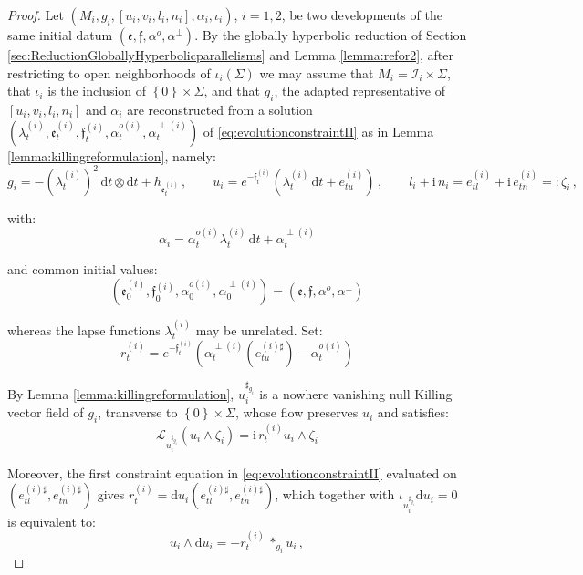 \documentclass[10pt,reqno,a4paper]{amsart}
\theoremstyle{plain}
\theoremstyle{definition}
\theoremstyle{remark}
\theoremstyle{remark}
\def\dd{\mathrm{d}}
\def\cI{\mathcal{I}}
\def\cL{\mathcal{L}}
\def\cL{\mathcal{L}}
\def\fre{\mathfrak{e}}
\renewcommand{\(}{ (}
\renewcommand{\)}{ )}
\newcommand{\frf}{\mathfrak{f}}
\begin{document}
\begin{proof}
Let $(M_i,g_i,[u_i,v_i,l_i,n_i],\alpha_i,\iota_i)$, $i = 1,2$, be two developments of the same initial datum $(\fre,\frf,\alpha^o,\alpha^{\perp})$. By the globally hyperbolic reduction of Section \ref{sec:ReductionGloballyHyperbolicparallelisms} and Lemma \ref{lemma:refor2}, after restricting to open neighborhoods of $\iota_i(\Sigma)$ we may assume that $M_i = \cI_i\times\Sigma$, that $\iota_i$ is the inclusion of $\left\{ 0\right\}\times\Sigma$, and that $g_i$, the adapted representative of $[u_i,v_i,l_i,n_i]$ and $\alpha_i$ are reconstructed from a solution $(\lambda^{(i)}_t,\fre^{(i)}_t,\frf^{(i)}_t,\alpha^{o(i)}_t,\alpha^{\perp(i)}_t)$ of \eqref{eq:evolutionconstraintII} as in Lemma \ref{lemma:killingreformulation}, namely:
\begin{equation}
\label{eq:initialcurrentnormalization}
g_i = -(\lambda^{(i)}_t)^2\, \dd t\otimes \dd t + h_{\fre^{(i)}_t}\, , \qquad u_i = e^{-\frf^{(i)}_t} ( \lambda^{(i)}_t\, \dd t + e^{(i)}_{tu} )\, , \qquad l_i + \mathrm{i}\, n_i = e^{(i)}_{tl} + \mathrm{i}\, e^{(i)}_{tn} =: \zeta_i\, ,
\end{equation}

\noindent
with:
\begin{equation*}
\alpha_i = \alpha^{o(i)}_t\lambda^{(i)}_t\, \dd t + \alpha^{\perp(i)}_t    
\end{equation*}

\noindent
and common initial values:
\begin{equation*}
(\fre^{(i)}_0,\frf^{(i)}_0,\alpha^{o(i)}_0,\alpha^{\perp(i)}_0) = (\fre,\frf,\alpha^o,\alpha^{\perp})    
\end{equation*}

\noindent
whereas the lapse functions $\lambda^{(i)}_t$ may be unrelated. Set:
\begin{equation*}
r^{(i)}_t = e^{-\frf^{(i)}_t}(\alpha^{\perp(i)}_t(e^{(i)\sharp}_{tu}) - \alpha^{o(i)}_t)    
\end{equation*}

\noindent
By Lemma \ref{lemma:killingreformulation}, $u_i^{\sharp_{g_i}}$ is a nowhere vanishing null Killing vector field of $g_i$, transverse to $\left\{ 0\right\}\times\Sigma$, whose flow preserves $u_i$ and satisfies:
\begin{equation*}
\cL_{u_i^{\sharp_{g_i}}}(u_i\wedge\zeta_i) = \mathrm{i}\, r^{(i)}_t u_i\wedge\zeta_i    
\end{equation*}

\noindent
Moreover, the first constraint equation in \eqref{eq:evolutionconstraintII} evaluated on $(e^{(i)\sharp}_{tl},e^{(i)\sharp}_{tn})$ gives $r^{(i)}_t = \dd u_i(e^{(i)\sharp}_{tl},e^{(i)\sharp}_{tn})$, which together with $\iota_{u_i^{\sharp_{g_i}}}\dd u_i = 0$ is equivalent to:
\begin{equation*}
u_i\wedge\dd u_i = -r^{(i)}_t\, \ast_{g_i}u_i\, ,
\end{equation*}


\end{proof}
\end{document}

